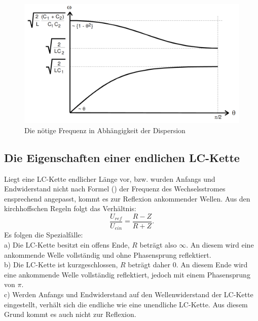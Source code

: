  \begin{figure}[H]
   \centering
   \includegraphics[width=\linewidth-200pt,height=\textheight-200pt,keepaspectratio]{content/Grafiken/Dispersionskurven.png}
   \caption{Die nötige Frequenz in Abhängigkeit der Dispersion}
   \label{fig:LC-Kette}
 \end{figure}


\subsection{Die Eigenschaften einer endlichen LC-Kette}
Liegt eine LC-Kette endlicher Länge vor, bzw. wurden Anfangs und Endwiderstand
 nicht nach Formel () der Frequenz des Wechselsstromes ensprechend angepasst,
  kommt es zur Reflexion ankommender Wellen. Aus den kirchhoffschen Regeln folgt das Verhältnis:
  \begin{equation}
    \frac{U_{ref}}{U_{ein}} = \frac{R-Z}{R+Z}\text{.}
  \end{equation}
  Es folgen die Spezialfälle:\\

  a) Die LC-Kette besitzt ein offens Ende, $R$ beträgt also $\infty$. An diesem
   wird eine ankommende Welle vollständig und ohne Phasensprung reflektiert.\\

  b) Die LC-Kette ist kurzgeschlossen, $R$ beträgt daher 0. An diesem Ende wird
   eine ankommende Welle vollständig reflektiert, jedoch mit einem Phasensprung von $\pi$.\\

 c) Werden Anfangs und Endwiderstand auf den Wellenwiderstand der LC-Kette eingestellt, verhält
  sich die endliche wie eine unendliche LC-Kette. Aus diesem Grund kommt es auch nicht zur Reflexion.
